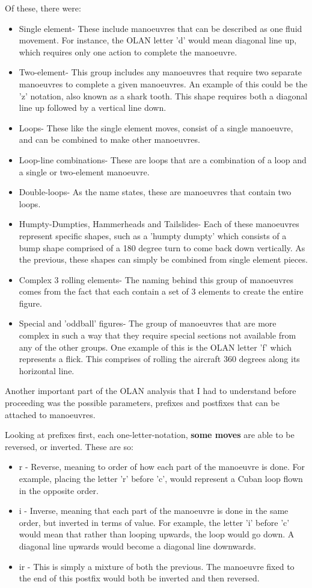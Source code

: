 Of these, there were:
\begin{itemize}
	\item Single element- These include manoeuvres that can be described as one fluid movement. For instance, the OLAN letter 'd' would mean diagonal line up, which requires only one action to complete the manoeuvre.
	\item Two-element- This group includes any manoeuvres that require two separate manoeuvres to complete a given manoeuvres. An example of this could be the 'z' notation, also known as a shark tooth. This shape requires both a diagonal line up followed by a vertical line down. 
	\item Loops- These like the single element moves, consist of a single manoeuvre, and can be combined to make other manoeuvres.
	\item Loop-line combinations- These are loops that are a combination of a loop and a single or two-element manoeuvre.
	\item Double-loops- As the name states, these are manoeuvres that contain two loops.
	\item Humpty-Dumpties, Hammerheads and Tailslides- Each of these manoeuvres represent specific shapes, such as a 'humpty dumpty' which consists of a bump shape comprised of a 180 degree turn to come back down vertically. As the previous, these shapes can simply be combined from single element pieces. 
	\item Complex 3 rolling elements- The naming behind this group of manoeuvres comes from the fact that each contain a set of 3 elements to create the entire figure.
	\item Special and 'oddball' figures- The group of manoeuvres that are more complex in such a way that they require special sections not available from any of the other groups. One example of this is the OLAN letter 'f' which represents a flick. This comprises of rolling the aircraft 360 degrees along its horizontal line.
\end{itemize}

Another important part of the OLAN analysis that I had to understand before proceeding was the possible parameters, prefixes and postfixes that can be attached to manoeuvres. 

Looking at prefixes first, each one-letter-notation, \textbf{some moves} are able to be reversed, or inverted. These are so:
\begin{itemize}
	\item r - Reverse, meaning to order of how each part of the manoeuvre is done. For example, placing the letter 'r' before 'c', would represent a Cuban loop flown in the opposite order. 
	\item i - Inverse, meaning that each part of the manoeuvre is done in the same order, but inverted in terms of value. For example, the letter 'i' before 'c' would mean that rather than looping upwards, the loop would go down. A diagonal line upwards would become a diagonal line downwards.
	\item ir - This is simply a mixture of both the previous. The manoeuvre fixed to the end of this postfix would both be inverted and then reversed. 
\end{itemize}


